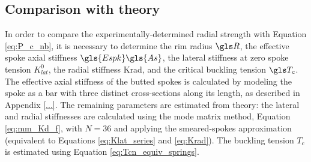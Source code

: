 \documentclass[\rootdir/thesis.tex]{subfiles}
\begin{document}
\subsection{Comparison with theory}
In order to compare the experimentally-determined radial strength with Equation \eqref{eq:P_c_nb}, it is necessary to determine the rim radius $\R$, the effective spoke axial stiffness $\gls{Espk}\gls{As}$, the lateral stiffness at zero spoke tension $K_{lat}^0$, the radial stiffness \gls{Krad}, and the critical buckling tension $\T_c$. The effective axial stiffness of the butted spokes is calculated by modeling the spoke as a bar with three distinct cross-sections along its length, as described in Appendix \ref{...}. The remaining parameters are estimated from theory: the lateral and radial stiffnesses are calculated using the mode matrix method, Equation \eqref{eq:mm_Kd_f}, with $N=36$ and applying the smeared-spokes approximation (equivalent to Equations \eqref{eq:Klat_series} and \eqref{eq:Krad}). The buckling tension $T_c$ is estimated using Equation \eqref{eq:Tcn_equiv_springs}.



\end{document}

